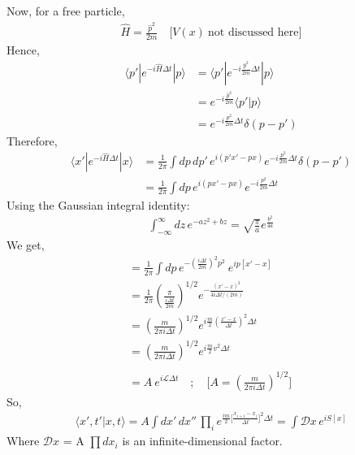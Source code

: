\documentclass[14pt]{article} %
\begin{document}
Now, for a free particle,
\begin{align*}
\hat{H} = \frac{\hat{p}^2}{2m} \quad \big[ V(x) ~\text{not discussed here} \big]
\end{align*}
Hence,
\begin{align*}
\langle p' | e^{-i \hat{H} \Delta t} | p \rangle &= \langle p' | e^{-i \frac{\hat{p}^2}{2m} \Delta t} | p \rangle\\
&= e^{-i \frac{\hat{p}^2}{2m}} \langle p'|p \rangle \\
&= e^{-i \frac{p^2}{2m} \Delta t} \delta(p - p')
\end{align*}
Therefore,
\begin{align*}
\langle x' | e^{-i \hat{H} \Delta t} | x \rangle &= \frac{1}{2\pi} \int dp \, dp' \, e^{i(p' x' - p x)} e^{-i \frac{p^2}{2m} \Delta t} \delta(p - p') \\
&= \frac{1}{2\pi} \int dp \, e^{i (p x' - px)} e^{-i \frac{p^2}{2m} \Delta t}
\end{align*}
Using the Gaussian integral identity:
\begin{align*}
\int_{-\infty}^{\infty} dz \, e^{-a z^2 + b z} = \sqrt{\frac{\pi}{a}} e^{\frac{b^2}{4a}}
\end{align*}
We get,
\begin{align*}
&= \frac{1}{2\pi} \int dp \,e^{- {(\frac{i \Delta t}{2m})}^2 p^2} ~ e^{ ip [ x' -x ] } \\
&= \frac{1}{2\pi} \left( \frac{\pi}{\frac{i \Delta t}{2m}} \right)^{1/2} 
e^{- \frac{(x' - x)^2}{4 i \Delta t / (2m)}} \\
&= \left( \frac{m}{2 \pi i \Delta t} \right)^{1/2} 
e^{i \frac{m}{2} {\left( \frac{x' - x}{\Delta t} \right)}^2 \Delta t} \\
&= \left( \frac{m}{2 \pi i \Delta t} \right)^{1/2} 
e^{i \frac{m}{2} v^2 \Delta t} \\\\
&= A ~ e^{ i \mathcal{L} \Delta t } \quad ; \quad \big[ A= \left( \frac{m}{2 \pi i \Delta t} \right)^{1/2} \big] \quad
\end{align*}
So,
\begin{align*}
\langle x', t' | x, t \rangle = A \int dx'\,dx'' \, \prod_i e^{{\frac{im}{2}\big[\frac{x_{i+1} - x_i}{\Delta t}}\big]^2 \Delta t} = \int \mathcal{D}x \, e^{i S[x]}
\end{align*}
Where $\mathcal{D}x$ = A $\prod dx_i$ is an infinite-dimensional factor.

\newpage
\end{document}
